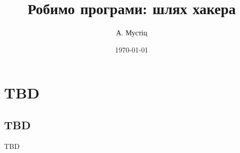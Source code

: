 \documentclass{book}
\title{Робимо програми: шлях хакера}
\author{А. Мустіц}
\date{\today}
\begin{document}
\maketitle
\chapter{TBD}
\section{TBD}
TBD
\end{document}
